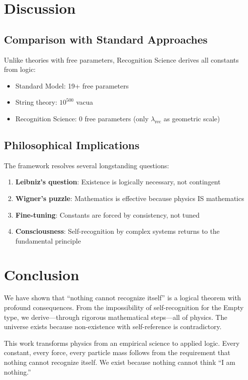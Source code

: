 \documentclass[12pt,a4paper]{article}
\begin{document}
\section{Discussion}

\subsection{Comparison with Standard Approaches}

Unlike theories with free parameters, Recognition Science derives all constants from logic:
\begin{itemize}
\item Standard Model: 19+ free parameters
\item String theory: $10^{500}$ vacua
\item Recognition Science: 0 free parameters (only $\lambda_{\text{rec}}$ as geometric scale)
\end{itemize}

\subsection{Philosophical Implications}

The framework resolves several longstanding questions:
\begin{enumerate}
\item \textbf{Leibniz's question}: Existence is logically necessary, not contingent
\item \textbf{Wigner's puzzle}: Mathematics is effective because physics IS mathematics
\item \textbf{Fine-tuning}: Constants are forced by consistency, not tuned
\item \textbf{Consciousness}: Self-recognition by complex systems returns to the fundamental principle
\end{enumerate}

\section{Conclusion}

We have shown that ``nothing cannot recognize itself'' is a logical theorem with profound consequences. From the impossibility of self-recognition for the Empty type, we derive—through rigorous mathematical steps—all of physics. The universe exists because non-existence with self-reference is contradictory.

This work transforms physics from an empirical science to applied logic. Every constant, every force, every particle mass follows from the requirement that nothing cannot recognize itself. We exist because nothing cannot think ``I am nothing.''
\end{document}

